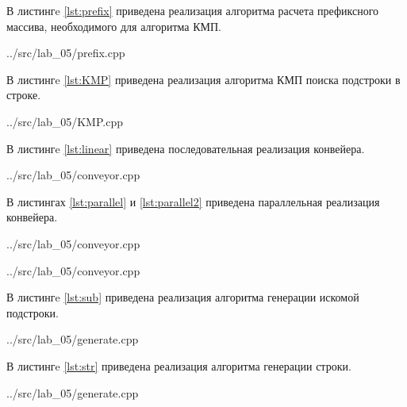 В листингe \ref{lst:prefix} приведена реализация алгоритма расчета префиксного массива, необходимого для алгоритма КМП.

\begin{lstinputlisting}[
	label={lst:prefix},
	caption={Расчет префиксного массива},
	firstline=8,
	lastline=23
	]{../src/lab_05/prefix.cpp}
\end{lstinputlisting}

В листингe \ref{lst:KMP} приведена реализация алгоритма КМП поиска подстроки в строке.

\begin{lstinputlisting}[
	label={lst:KMP},
	caption={Алгоритм КМП},
	firstline=11,
	lastline=33
	]{../src/lab_05/KMP.cpp}
\end{lstinputlisting}
\newpage

В листингe \ref{lst:linear} приведена последовательная реализация конвейера.

\begin{lstinputlisting}[
	label={lst:linear},
	caption={Последовательный конвейер},
	firstline=14,
	lastline=26
	]{../src/lab_05/conveyor.cpp}
\end{lstinputlisting}

В листингах \ref{lst:parallel} и \ref{lst:parallel2} приведена параллельная реализация конвейера.

\begin{lstinputlisting}[
	label={lst:parallel},
	caption={Параллельный конвейер},
	firstline=28,
	lastline=45
	]{../src/lab_05/conveyor.cpp}
\end{lstinputlisting}

\newpage

\begin{lstinputlisting}[
	label={lst:parallel2},
	caption={Продолжение листинга \ref{lst:parallel}},
	firstline=47,
	lastline=66
	]{../src/lab_05/conveyor.cpp}
\end{lstinputlisting}

В листингe \ref{lst:sub} приведена реализация алгоритма генерации искомой подстроки.

\begin{lstinputlisting}[
	label={lst:sub},
	caption={Генерация подстроки},
	firstline=7,
	lastline=18
	]{../src/lab_05/generate.cpp}
\end{lstinputlisting}

\newpage
В листингe \ref{lst:str} приведена реализация алгоритма генерации строки.

\begin{lstinputlisting}[
	label={lst:str},
	caption={Генерация строки},
	firstline=20,
	lastline=40
	]{../src/lab_05/generate.cpp}
\end{lstinputlisting}